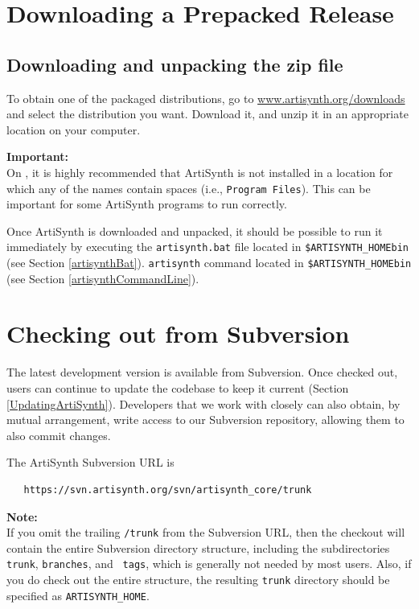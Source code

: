 \section{Downloading a Prepacked Release}
\label{PrepackagedRelease}

\subsection{Downloading and unpacking the zip file}

To obtain one of the packaged distributions, go to
\href{http://www.artisynth.org/downloads} 
{www.artisynth.org/downloads}
and select the distribution
you want. Download it, and unzip it in an appropriate location on your
computer.

\ifWindows
\begin{sideblock}
{\bf Important:}\\
On \SYSTEM, it is highly recommended that ArtiSynth is not installed
in a location for which any of the \directory names contain spaces (i.e.,
{\tt Program Files}).  This can be important for some ArtiSynth
programs to run correctly.
\end{sideblock}
\else\fi

Once ArtiSynth is downloaded and unpacked, it should be possible to
run it immediately by executing the
\ifWindows
{\tt artisynth.bat} file located in {\tt \$ARTISYNTH\_HOME\SEP bin}
(see Section \ref{artisynthBat}).
\else
{\tt artisynth} command located in {\tt \$ARTISYNTH\_HOME\SEP bin}
(see Section \ref{artisynthCommandLine}).
\fi

\section{Checking out from Subversion}
\label{SubversionCheckout}

The latest development version is available from Subversion. Once
checked out, users can continue to update the codebase to keep it
current (Section \ref{UpdatingArtiSynth}). Developers that we work
with closely can also obtain, by mutual arrangement, write access to
our Subversion repository, allowing them to also commit changes.

The ArtiSynth Subversion URL is
\begin{verbatim}
   https://svn.artisynth.org/svn/artisynth_core/trunk
\end{verbatim}

\begin{sideblock}
{\bf Note:}\\
If you omit the trailing {\tt /trunk} from the Subversion URL, then
the checkout will contain the entire Subversion directory structure,
including the subdirectories {\tt trunk}, {\tt branches}, and {\tt
tags}, which is generally not needed by most users. Also, if you do
check out the entire structure, the resulting {\tt trunk} directory
should be specified as {\tt ARTISYNTH\_HOME}.
\end{sideblock}

